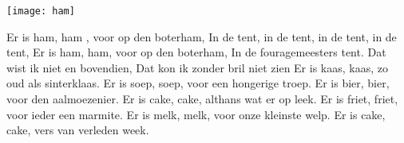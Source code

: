 \begin{intersong}
    \texttt{[image: ham]}
\end{intersong}
\beginverse
Er is ham, ham , voor op den boterham,
In de tent, in de tent, in de tent, in de tent,
Er is ham, ham, voor op den boterham,
In de fouragemeesters tent. 
\endverse
\beginchorus
Dat wist ik niet en bovendien, 
Dat kon ik zonder bril niet zien   
\endchorus
\beginverse
Er is kaas, kaas, zo oud als sinterklaas.
\endverse
\beginverse
Er is soep, soep, voor een hongerige troep.
\endverse
\beginverse
Er is bier, bier, voor den aalmoezenier.
\endverse
\beginverse
Er is cake, cake, althans wat er op leek.
\endverse
\beginverse
Er is friet, friet, voor ieder een marmite. 
\endverse
\beginverse
Er is melk, melk, voor onze kleinste welp. 
\endverse
\beginverse
Er is cake, cake, vers van verleden week. 
\endverse
\endsong